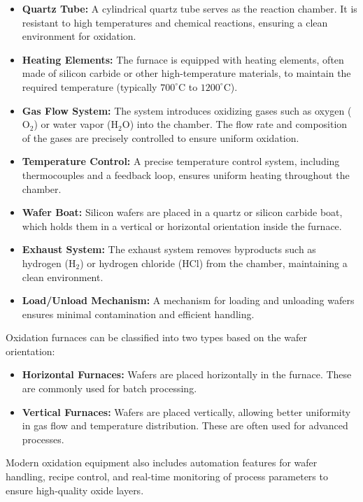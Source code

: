 \documentclass{report}
\begin{document}
\begin{itemize}
    \item \textbf{Quartz Tube:} A cylindrical quartz tube serves as the reaction chamber. It is resistant to high temperatures and chemical reactions, ensuring a clean environment for oxidation.
    \item \textbf{Heating Elements:} The furnace is equipped with heating elements, often made of silicon carbide or other high-temperature materials, to maintain the required temperature (typically $700^\circ\text{C}$ to $1200^\circ\text{C}$).
    \item \textbf{Gas Flow System:} The system introduces oxidizing gases such as oxygen ($\text{O}_2$) or water vapor ($\text{H}_2\text{O}$) into the chamber. The flow rate and composition of the gases are precisely controlled to ensure uniform oxidation.
    \item \textbf{Temperature Control:} A precise temperature control system, including thermocouples and a feedback loop, ensures uniform heating throughout the chamber.
    \item \textbf{Wafer Boat:} Silicon wafers are placed in a quartz or silicon carbide boat, which holds them in a vertical or horizontal orientation inside the furnace.
    \item \textbf{Exhaust System:} The exhaust system removes byproducts such as hydrogen ($\text{H}_2$) or hydrogen chloride ($\text{HCl}$) from the chamber, maintaining a clean environment.
    \item \textbf{Load/Unload Mechanism:} A mechanism for loading and unloading wafers ensures minimal contamination and efficient handling.
\end{itemize}

Oxidation furnaces can be classified into two types based on the wafer orientation:
\begin{itemize}
    \item \textbf{Horizontal Furnaces:} Wafers are placed horizontally in the furnace. These are commonly used for batch processing.
    \item \textbf{Vertical Furnaces:} Wafers are placed vertically, allowing better uniformity in gas flow and temperature distribution. These are often used for advanced processes.
\end{itemize}

Modern oxidation equipment also includes automation features for wafer handling, recipe control, and real-time monitoring of process parameters to ensure high-quality oxide layers.
\end{document}
